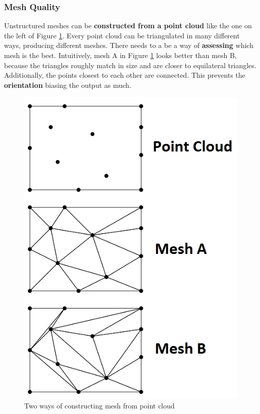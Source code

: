 \documentclass{article}
\begin{document}
\subsubsection{Mesh Quality}
\label{sec:mesh-quality}

Unstructured meshes can be \textbf{constructed from a point cloud} like the one on the left of Figure \ref{fig:unstructured-mesh-construction}. Every point cloud can be triangulated in many different ways, producing different meshes. There needs to a be a way of \textbf{assessing} which mesh is the best. Intuitively, mesh A in Figure \ref{fig:unstructured-mesh-construction} looks better than mesh B, because the triangles roughly match in size and are closer to equilateral triangles. Additionally, the points closest to each other are connected. This prevents the \textbf{orientation} biasing the output as much.

\begin{figure}
	\centering
	\includegraphics[scale=0.35]{figures/mesh-quality-example.png}
	\caption{Two ways of constructing mesh from point cloud}
	\label{fig:unstructured-mesh-construction}
\end{figure}
\end{document}
